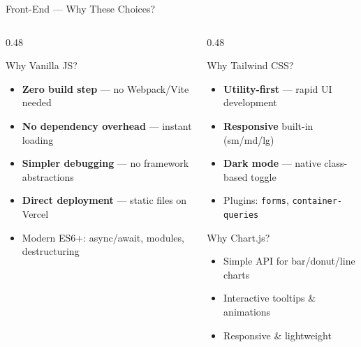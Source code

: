 \documentclass[aspectratio=169, 12pt]{beamer}
\begin{document}
\begin{frame}{Front-End --- Why These Choices?}

\begin{columns}[T]
\begin{column}{0.48\textwidth}
\begin{block}{Why Vanilla JS?}
\begin{itemize}\itemsep=2pt
    \item \textbf{Zero build step} --- no Webpack/Vite needed
    \item \textbf{No dependency overhead} --- instant loading
    \item \textbf{Simpler debugging} --- no framework abstractions
    \item \textbf{Direct deployment} --- static files on Vercel
    \item Modern ES6+: async/await, modules, destructuring
\end{itemize}
\end{block}
\end{column}
\begin{column}{0.48\textwidth}
\begin{block}{Why Tailwind CSS?}
\begin{itemize}\itemsep=2pt
    \item \textbf{Utility-first} --- rapid UI development
    \item \textbf{Responsive} built-in (sm/md/lg)
    \item \textbf{Dark mode} --- native class-based toggle
    \item Plugins: \texttt{forms}, \texttt{container-queries}
\end{itemize}
\end{block}
\vspace{4pt}
\begin{block}{Why Chart.js?}
\begin{itemize}\itemsep=2pt
    \item Simple API for bar/donut/line charts
    \item Interactive tooltips \& animations
    \item Responsive \& lightweight
\end{itemize}
\end{block}
\end{column}
\end{columns}
\end{frame}
\end{document}
